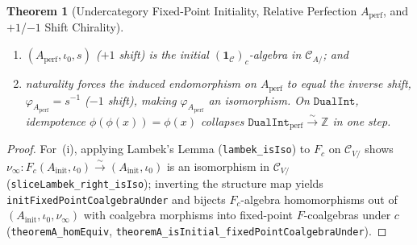 \documentclass[10pt,twoside,openright]{book}
\theoremstyle{crmplain}
\newtheorem{theorem}{Theorem}[section]
\theoremstyle{crmdef}
\theoremstyle{crmremark}
\begin{document}
\begin{theorem}[Undercategory Fixed-Point Initiality, Relative Perfection $A_{\mathrm{perf}}$, and $+1$/$-1$ Shift Chirality]
\begin{enumerate}[label=\textup{(\roman*)},leftmargin=2.0em]
\begin{enumerate}[label=\textup{(\alph*)},leftmargin=1.6em]
    \item $(A_{\mathrm{perf}}, \iota_0, s)$ ($+1$ shift) is the initial $(\mathbf{1}_{\mathcal{C}})_c$-algebra in $\mathcal{C}_{A/}$; and
    \item naturality forces the induced endomorphism on $A_{\mathrm{perf}}$ to equal the \emph{inverse} shift, $\varphi_{A_{\mathrm{perf}}} = s^{-1}$ ($-1$ shift), making $\varphi_{A_{\mathrm{perf}}}$ an isomorphism. On $\mathtt{DualInt}$, idempotence $\phi(\phi(x)) = \phi(x)$ collapses $\mathtt{DualInt}_{\mathrm{perf}} \xrightarrow{\sim} \mathbb{Z}$ in one step.
  \end{enumerate}
\end{enumerate}
\end{theorem}

\begin{proof}
For~(i), applying Lambek's Lemma (\texttt{lambek\_isIso}) to $F_c$ on $\mathcal{C}_{V/}$ shows $\nu_\infty : F_c(A_{\mathrm{init}}, \iota_0) \xrightarrow{\sim} (A_{\mathrm{init}}, \iota_0)$ is an isomorphism in $\mathcal{C}_{V/}$ (\texttt{sliceLambek\_right\_isIso}); inverting the structure map yields \texttt{initFixedPointCoalgebraUnder} and bijects $F_c$-algebra homomorphisms out of $(A_{\mathrm{init}}, \iota_0, \nu_\infty)$ with coalgebra morphisms into fixed-point $F$-coalgebras under $c$ (\texttt{theoremA\_homEquiv}, \texttt{theoremA\_isInitial\_fixedPointCoalgebraUnder}).


\end{proof}
\end{document}
